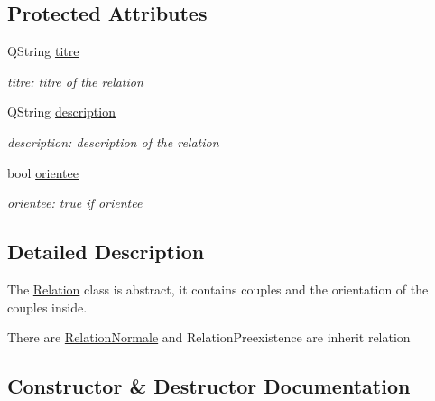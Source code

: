 \subsection*{Protected Attributes}
\begin{DoxyCompactItemize}
\item 
\mbox{\label{class_relation_a346e9b10df6757dee8dc13cb2f876357}} 
Q\+String \hyperlink{class_relation_a346e9b10df6757dee8dc13cb2f876357}{titre}
\begin{DoxyCompactList}\small\item\em titre\+: titre of the relation \end{DoxyCompactList}\item 
\mbox{\label{class_relation_a1140829291bd04a86d0b840524692703}} 
Q\+String \hyperlink{class_relation_a1140829291bd04a86d0b840524692703}{description}
\begin{DoxyCompactList}\small\item\em description\+: description of the relation \end{DoxyCompactList}\item 
\mbox{\label{class_relation_a1fb045a9e851d6989310ac89f5addc80}} 
bool \hyperlink{class_relation_a1fb045a9e851d6989310ac89f5addc80}{orientee}
\begin{DoxyCompactList}\small\item\em orientee\+: true if orientee \end{DoxyCompactList}\end{DoxyCompactItemize}


\subsection{Detailed Description}
The \hyperlink{class_relation}{Relation} class is abstract, it contains couples and the orientation of the couples inside. 

There are \hyperlink{class_relation_normale}{Relation\+Normale} and Relation\+Preexistence are inherit relation 

\subsection{Constructor \& Destructor Documentation}
\mbox{\label{class_relation_a2e93c9b24ab0748753655bdceb523d68}} 
